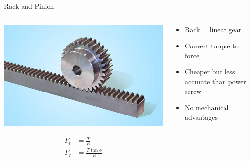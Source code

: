 \documentclass[10pt, svgnames]{beamer}
\begin{document}
\begin{frame}[label={sec:org843dba8}]{Rack and Pinion}
\begin{columns}
\begin{column}{0.5\columnwidth}
\begin{center}
\includegraphics[width=.9\linewidth]{pictures/rack_n_pinion.jpg}
\end{center}

\begin{align*}
      F_{t} &= \frac{T}{R} \\
      F_{r} &= \frac{T \tan \phi}{R}
\end{align*}
\end{column}

\begin{column}{0.5\columnwidth}
\begin{itemize}
\item Rack = linear gear

\item Convert torque to force

\item Cheaper but less accurate than power screw

\item No mechanical advantages
\end{itemize}
\end{column}
\end{columns}
\end{frame}
\end{document}
